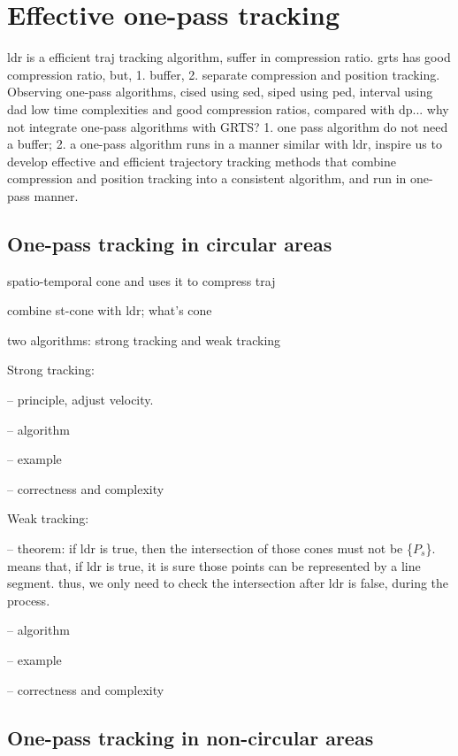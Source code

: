 

\section{Effective one-pass tracking}
\label{sec:traj}
ldr is a efficient traj tracking algorithm, suffer in compression ratio.
grts has good compression ratio, but, 1. buffer, 2. separate compression and position tracking.
Observing one-pass algorithms, cised using sed, siped using ped, interval using dad
low time complexities and good compression ratios, compared with dp...
why not integrate one-pass algorithms with GRTS? 
1. one pass algorithm do not need a buffer; 2. a one-pass algorithm runs in a manner similar with ldr, 
inspire us to develop effective and efficient trajectory tracking methods that combine compression and position tracking into a consistent algorithm, and run in one-pass manner. 

\subsection{One-pass tracking in circular areas}

spatio-temporal cone and uses it to compress traj

combine st-cone with ldr; what's cone


two algorithms: strong tracking and weak tracking

Strong tracking: 

-- principle, adjust velocity.

-- algorithm

-- example

-- correctness and complexity

Weak tracking:

-- theorem: if ldr is true, then the intersection of those cones must not be \{$P_s$\}.
means that, if ldr is true, it is sure those points can be represented by a line segment.
thus, we only need to check the intersection after ldr is false, during the process.

-- algorithm

-- example

-- correctness and complexity

\subsection{One-pass tracking in non-circular areas}

